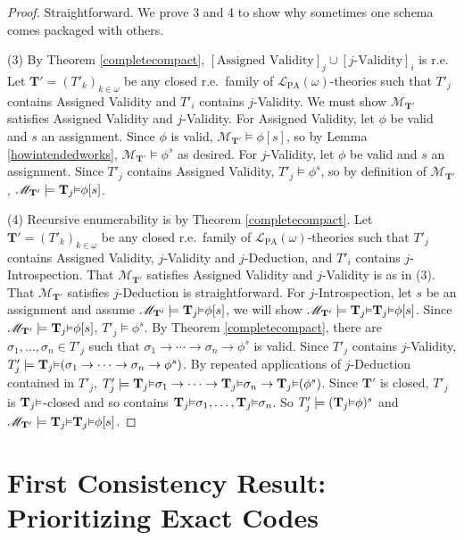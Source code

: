 \documentclass[reqno]{article}
\theoremstyle{definition}
\def\L{\mathscr{L}}
\def\M{\mathscr{M}}
\def\T{\mathbf{T}}
\def\LPA{\L_{\mathrm{PA}}}
\renewcommand{\Pr}[1]{\T_{#1}\mbox{\small${\vDash}$}}
\begin{document}
\begin{proof}
Straightforward.
We prove 3 and 4 to show why sometimes one schema comes packaged with others.

\item
(3)
By Theorem \ref{completecompact}, $[\mbox{Assigned Validity}]_j\cup[\mbox{$j$-Validity}]_i$
is r.e.
Let $\T'=(T'_k)_{k\in \omega}$ be any closed r.e.~family
of $\LPA(\omega)$-theories such that $T'_j$ contains Assigned Validity
and $T'_i$ contains $j$-Validity.
We must show $\M_{\T'}$ satisfies Assigned Validity and $j$-Validity.
For Assigned Validity, let $\phi$ be valid and $s$ an assignment.
Since $\phi$ is valid, $\M_{\T'}\models\phi[s]$, so by Lemma \ref{howintendedworks},
$\M_{\T'}\models\phi^s$ as desired.  For $j$-Validity,
let $\phi$ be valid and $s$ an assignment.
Since $T'_j$ contains Assigned Validity, $T'_j\models\phi^s$, so
by definition of $\M_{\T'}$, $\M_{\T'}\models \Pr j\phi[s]$.

\item
(4)
Recursive enumerability is by Theorem \ref{completecompact}.
%
%
Let $\T'=(T'_k)_{k\in\omega}$ be any closed r.e.~family
of $\LPA(\omega)$-theories such that $T'_j$ contains Assigned Validity, $j$-Validity and $j$-Deduction,
and $T'_i$ contains $j$-Introspection.
That $\M_{\T'}$ satisfies Assigned Validity and $j$-Validity is as in (3).
That $\M_{\T'}$ satisfies $j$-Deduction is straightforward.
For $j$-Introspection, let $s$ be an assignment and assume
$\M_{\T'}\models \Pr j\phi[s]$, we will show $\M_{\T'}\models\Pr j\Pr j\phi[s]$.
Since $\M_{\T'}\models \Pr j\phi[s]$, $T'_j\models\phi^s$.
By Theorem \ref{completecompact}, there are $\sigma_1,\ldots,\sigma_n\in T'_j$
such that $\sigma_1\rightarrow\cdots\rightarrow\sigma_n\rightarrow\phi^s$
is valid.
Since $T'_j$ contains $j$-Validity,
$T'_j\models \Pr j(\sigma_1\rightarrow\cdots\rightarrow\sigma_n\rightarrow\phi^s)$.
By repeated applications of $j$-Deduction contained in $T'_j$,
$T'_j\models \Pr j\sigma_1\rightarrow\cdots\rightarrow\Pr j\sigma_n\rightarrow \Pr j(\phi^s)$.
Since $\T'$ is closed, $T'_j$ is $\Pr j$-closed and so contains $\Pr j\sigma_1,\ldots,\Pr j\sigma_n$.
So $T'_j\models (\Pr j\phi)^s$ and $\M_{\T'}\models \Pr j\Pr j\phi[s]$.
\end{proof}



\section{First Consistency Result: Prioritizing Exact Codes}
\end{document}
